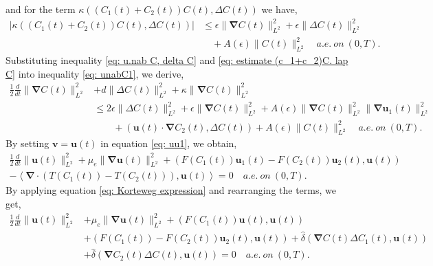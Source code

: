 \documentclass[final,3p,times]{elsarticle}
\theoremstyle{plain}
\theoremstyle{remark}
\theoremstyle{plain}
\theoremstyle{remark}
\begin{document}
and for the term $\kappa \left(\left(C_1\left(t\right)+C_2\left(t\right)\right)C\left(t\right),\Delta C\left(t\right)\right)$ we have,
\begin{align}
    \left | \kappa \left(\left(C_1\left(t\right)+C_2\left(t\right)\right)C\left(t\right),\Delta C\left(t\right)\right) \right | 
    & \le \epsilon \|\boldsymbol{\nabla} C\left(t\right)\|_{L^2}^2 + 
    \epsilon \|\Delta C\left(t\right)\|_{L^2}^2 \nonumber \\ 
    & \quad + A\left(\epsilon\right) \|C\left(t\right)\|_{L^2}^2 \quad a.e. \ on \ \left(0,T\right).\label{eq: estimate (c_1+c_2)C. lap C}
\end{align}
Substituting inequality \eqref{eq: u.nab C, delta C} and \eqref{eq: estimate (c_1+c_2)C. lap C} into inequality \eqref{eq: unabC1}, we derive,
\begin{align}
    \frac{  1}{2}\frac{d}{dt}\|\boldsymbol{\nabla} C\left(t\right)\|^2_{L^2}
    & +d \| \Delta C\left(t\right)\|^2_{L^2}+\kappa \|\boldsymbol{\nabla} C\left(t\right)\|_{L^2}^2 \nonumber \\
    & \le 2 \epsilon \| \Delta C\left(t\right)\|^{2}_{L^2} + \epsilon \|\boldsymbol{\nabla} C\left(t\right)\|_{L^2}^2 + A\left(\epsilon\right) \|\boldsymbol{\nabla} C\left(t\right)\|^{2}_{L^2} \|\boldsymbol{\nabla} \mathbf u_1(t)\|^{2}_{L^2} \nonumber \\
    & \qquad + \left(\mathbf u\left(t\right) \cdot \boldsymbol{\nabla} C_2\left(t\right) ,\Delta C\left(t\right)\right) + A\left(\epsilon\right) \|C\left(t\right)\|_{L^2}^2
    \quad a.e.\ on\ \left(0,T\right) \label{eq: unabC2}.
\end{align}
By setting $\mathbf{v} = \mathbf{u}\left(t\right)$ in equation \eqref{eq: uu1}, we obtain,
\begin{align}
   \frac{ 1}{2}\frac{d}{dt}\| \mathbf  u\left(t\right)\|^2_{L^2}+\mu _e\|\boldsymbol{\nabla}\mathbf{u}\left(t\right)\|^2_{L^2}+\left(F\left(C_1\left(t\right)\right) \mathbf u_1\left(t\right)-F\left(C_2\left(t\right)\right) \mathbf u_2\left(t\right),\mathbf u\left(t\right)\right)\nonumber\\- \left \langle\boldsymbol{\nabla}\cdot\left(T\left(C_1\left(t\right)\right)-T\left(C_2\left(t\right)\right)\right),\mathbf   u\left(t\right)\right \rangle=0  \quad a.e.\ on\ \left(0,T\right).
\end{align}
By applying equation \eqref{eq: Korteweg expression} and rearranging the terms, we get,
\begin{align}
   \frac{ 1}{2}\frac{d}{dt}\| \mathbf  u\left(t\right)\|^2_{L^2} 
   & + \mu _e \|\boldsymbol{\nabla}\mathbf{u}\left(t\right)\|^2_{L^2}+\left(F\left(C_1\left(t\right)\right)\mathbf u\left(t\right),\mathbf u\left(t\right)\right) \nonumber \\ 
   & + \left(F\left(C_1\left(t\right)\right)-F\left(C_2\left(t\right)\right)\mathbf u_2\left(t\right),
   \mathbf u\left(t\right)\right) + \hat \delta \left(\boldsymbol{\nabla} C\left(t\right) \Delta C_1\left(t\right),\mathbf u\left(t\right)\right) \nonumber \\
   & + \hat \delta \left(\boldsymbol{\nabla} C_2\left(t\right)\Delta C\left(t\right),\mathbf u\left(t\right)\right)=0  \quad a.e.\ on\ \left(0,T\right) \label{eq: uu3}.
\end{align}
\end{document}
